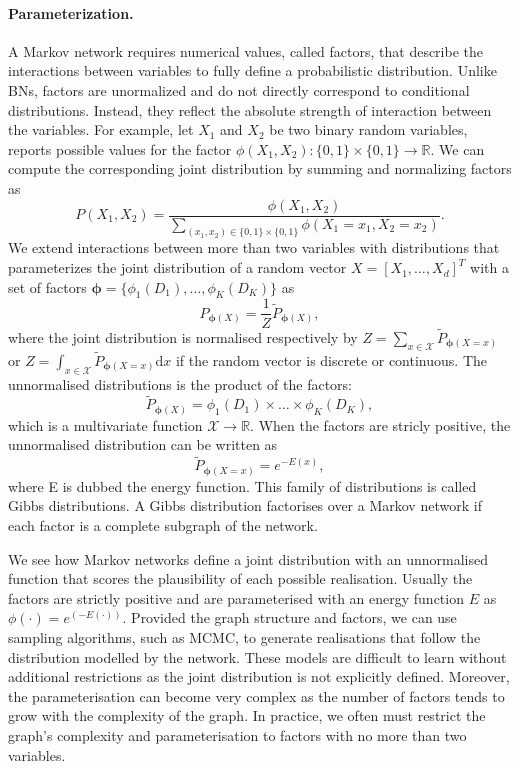 \paragraph{Parameterization.}
A Markov network requires numerical values, called factors, that describe the interactions between variables to fully define a probabilistic distribution. Unlike BNs, factors are unormalized and do not directly correspond to conditional distributions. Instead, they reflect the absolute strength of interaction between the variables. For example, let $X_1$ and $X_2$ be two binary random variables,  reports possible values for the factor $\phi(X_1, X_2): \{ 0, 1\} \times \{ 0, 1\} \rightarrow \mathbb{R}$. We can compute the corresponding joint distribution by summing and normalizing factors as
$$ P(X_1, X_2) = \frac{\phi(X_1, X_2)}{\sum_{(x_1, x_2) \in \{ 0, 1 \} \times \{ 0, 1\} } \phi(X_1=x_1, X_2=x_2)}. $$
We extend interactions between more than two variables with distributions that parameterizes the joint distribution of a random vector $X = \left[X_1, \hdots, X_d\right]^T$ with a set of factors $\bm{\phi} = \{ \phi_1(D_1), \dots, \phi_K(D_K) \}$ as
$$P_{\bm{\phi}(X)} = \frac{1}{Z}\tilde{P}_{\bm{\phi}(X)},$$
where the joint distribution is normalised respectively by $Z=\sum_{x \in \mathcal{X}}\tilde{P}_{\bm{\phi}(X=x)}$ or  $Z=\int_{x \in \mathcal{X}}\tilde{P}_{\bm{\phi}(X=x)}\text{d}x$ if the random vector is discrete or continuous. The unnormalised distributions is the product of the factors:
$$ \tilde{P}_{\bm{\phi}(X)} = \phi_1(D_1) \times \dots \times \phi_K(D_K), $$
which is a multivariate function $\mathcal{X} \rightarrow \mathbb{R}$. When the factors are stricly positive, the unnormalised distribution can be written as $$ \tilde{P}_{\bm{\phi}(X=x)} = e^{-E(x)}, $$ where E is dubbed the energy function. This family of distributions is called Gibbs distributions. A Gibbs distribution factorises over a Markov network if each factor is a complete subgraph of the network.

We see how Markov networks define a joint distribution with an unnormalised function that scores the plausibility of each possible realisation. Usually the factors are strictly positive and are parameterised with an energy function $E$ as $\phi(\cdot) = e^(-E(\cdot))$. Provided the graph structure and factors, we can use sampling algorithms, such as MCMC, to generate realisations that follow the distribution modelled by the network. These models are difficult to learn without additional restrictions as the joint distribution is not explicitly defined. Moreover, the parameterisation can become very complex as the number of factors tends to grow with the complexity of the graph. In practice, we often must restrict the graph's complexity and parameterisation to factors with no more than two variables.

